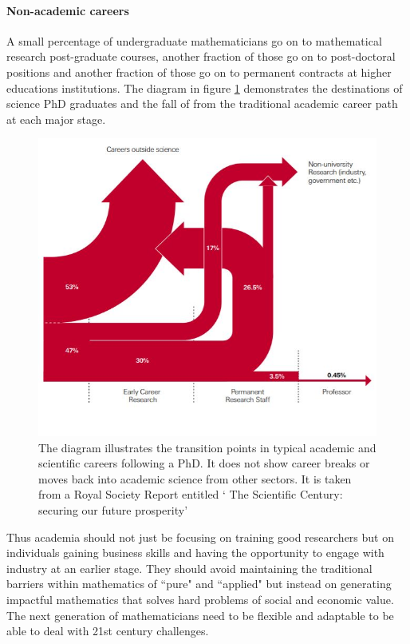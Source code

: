 \documentclass[11pt]{article} %
\begin{document}
\paragraph{Non-academic careers}

A small percentage of undergraduate mathematicians go on to mathematical research post-graduate courses, another fraction of those go on to post-doctoral positions and another fraction of those go on to permanent contracts at higher educations institutions. The diagram in figure \ref{fig:phd-career-paths} demonstrates the destinations of science PhD graduates and the fall of from the traditional academic career path at each major stage. 

\begin{figure}
	\centering
	\includegraphics[width=0.9\linewidth]{"Report_images/phd career paths"}
	\caption{The diagram illustrates the transition points in typical academic and scientific careers following a PhD. It does not show career breaks or moves back into academic science from other sectors. It is taken from a Royal Society Report entitled ` The Scientific Century: securing our future prosperity' \cite{royalsoc2010}}
	\label{fig:phd-career-paths}
\end{figure}

Thus academia should not just be focusing on training good researchers but on individuals gaining business skills and having the opportunity to engage with industry at an earlier stage. They should avoid maintaining the traditional barriers within mathematics of ``pure" and ``applied" but instead on  generating impactful mathematics that solves hard problems of social and economic value. The next generation of mathematicians need to be flexible and adaptable to be  able to deal with 21st century challenges.
\end{document}
